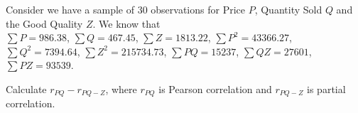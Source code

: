 
\begin{question}
Consider we have a sample of 30 observations for Price \(P\), Quantity Sold \(Q\) and the Good Quality \(Z\).
We know that\\
\(\sum{P} = 986.38\),
\(\sum{Q} = 467.45\),
\(\sum{Z} = 1813.22\),
\(\sum{P^2} = 43366.27\),
\(\sum{Q^2} = 7394.64\),
\(\sum{Z^2} = 215734.73\),
\(\sum{PQ} = 15237\),
\(\sum{QZ} = 27601\),
\(\sum{PZ} = 93539\).

Calculate \(r_{PQ} - r_{PQ-Z}\), where \(r_{PQ}\) is Pearson correlation and \(r_{PQ-Z}\) is partial correlation.
\end{question}


